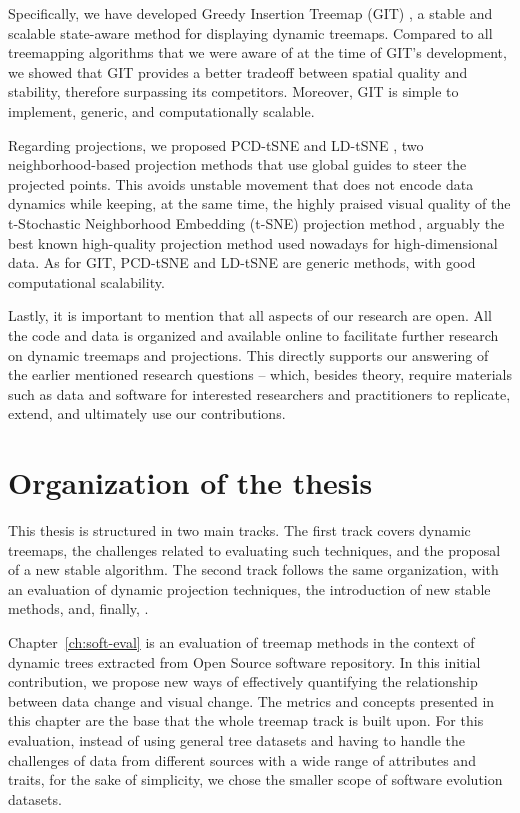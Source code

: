 Specifically, we have developed Greedy Insertion Treemap (GIT) \citep{vernier18git}, a stable and scalable state-aware method for displaying dynamic treemaps. Compared to all treemapping algorithms that we were aware of at the time of GIT's development, we showed that GIT provides a better tradeoff between spatial quality and stability, therefore surpassing its competitors. Moreover, GIT is simple to implement, generic, and computationally scalable.

Regarding projections, we proposed PCD-tSNE and LD-tSNE \citep{Vernier2021}, two neighborhood-based projection methods that use global guides to steer the projected points. This avoids unstable movement that does not encode data dynamics while keeping, at the same time, the highly praised visual quality of the t-Stochastic Neighborhood Embedding (t-SNE) projection method\,\citep{tsne}, arguably the best known high-quality projection method used nowadays for high-dimensional data. As for GIT, PCD-tSNE and LD-tSNE are generic methods, with good computational scalability.

\bigbreak

Lastly, it is important to mention that all aspects of our research are open. All the code and data is organized and available online to facilitate further research on dynamic treemaps and projections. This directly supports our answering of the earlier mentioned research questions -- which, besides theory, require materials such as data and software for interested researchers and practitioners to replicate, extend, and ultimately use our contributions.

\section{Organization of the thesis}

This thesis is structured in two main tracks. The first track covers dynamic treemaps, the challenges related to evaluating such techniques, and the proposal of a new stable algorithm. The second track follows the same organization, with an evaluation of dynamic projection techniques, the introduction of new stable methods, and, finally, .

Chapter~\ref{ch:soft-eval} is an evaluation of treemap methods in the context of dynamic trees extracted from Open Source software repository. In this initial contribution, we propose new ways of effectively quantifying the relationship between data change and visual change. The metrics and concepts presented in this chapter are the base that the whole treemap track is built upon. For this evaluation, instead of using general tree datasets and having to handle the challenges of data from different sources with a wide range of attributes and traits, for the sake of simplicity, we chose the smaller scope of software evolution datasets.

